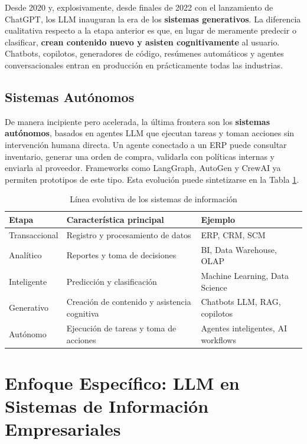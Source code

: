\documentclass[12pt,a4paper,oneside]{article}
\begin{document}
Desde 2020 y, explosivamente, desde finales de 2022 con el lanzamiento de ChatGPT, los LLM inauguran la era de los \textbf{sistemas generativos}. La diferencia cualitativa respecto a la etapa anterior es que, en lugar de meramente predecir o clasificar, \textbf{crean contenido
nuevo y asisten cognitivamente} al usuario. Chatbots, copilotos, generadores de código, resúmenes automáticos y agentes conversacionales entran en producción en prácticamente todas las industrias.

\subsection{Sistemas Autónomos}

De manera incipiente pero acelerada, la última frontera son los \textbf{sistemas autónomos}, basados en agentes LLM que ejecutan tareas y toman acciones sin intervención humana directa. Un agente conectado a un ERP puede consultar inventario, generar una orden de compra, validarla con políticas internas y enviarla al proveedor. Frameworks como LangGraph, AutoGen y CrewAI ya permiten prototipos de este tipo. Esta evolución puede sintetizarse en la Tabla \ref{tab:evolucion}.

\begin{table}[h!]
\centering
\caption{Línea evolutiva de los sistemas de información}
\label{tab:evolucion}
\begin{tabular}{p{3.5cm} p{5cm} p{5cm}}
\toprule
\textbf{Etapa} & \textbf{Característica principal} & \textbf{Ejemplo} \\
\midrule
Transaccional & Registro y procesamiento de datos & ERP, CRM, SCM \\
Analítico & Reportes y toma de decisiones & BI, Data Warehouse, OLAP \\
Inteligente & Predicción y clasificación & Machine Learning, Data Science \\
Generativo & Creación de contenido y asistencia cognitiva & Chatbots LLM, RAG, copilotos \\
Autónomo & Ejecución de tareas y toma de acciones & Agentes inteligentes, AI workflows \\
\bottomrule
\end{tabular}
\end{table}

\section{Enfoque Específico: LLM en Sistemas de Información Empresariales}
\end{document}
